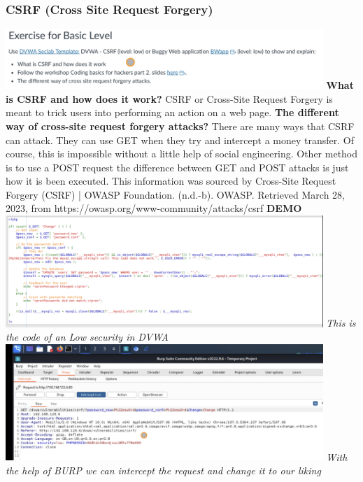 \documentclass[12pt, letterpaper]{article}
\begin{document}
\subsubsection{CSRF (Cross Site Request Forgery)}
\includegraphics[width=0.9\textwidth]{fotos/Week 4/CSRF basic.jpeg}
\textbf{What is CSRF and how does it work?}
\hfill\break
\hfill\break
CSRF or Cross-Site Request Forgery is meant to trick users into performing an action on a web page.
\hfill\break
\hfill\break
\textbf{The different way of cross-site request forgery attacks?}
\hfill\break
There are many ways that CSRF can attack. They can use GET when they try and intercept a money transfer. Of course, this is impossible without a little help of social engineering. Other method is to use a POST request the difference between GET and POST attacks is just how it is been executed.
\hfill\break
\hfill\break
This information was sourced by Cross-Site Request Forgery (CSRF) | OWASP Foundation. (n.d.-b). OWASP. Retrieved March 28, 2023, from https://owasp.org/www-community/attacks/csrf
\hfill\break
\hfill\break
\textbf{DEMO}
\hfill\break
\hfill\break
\includegraphics[width=0.9\textwidth]{fotos/Week 4/CSRF/CSRF source code low.jpeg}
\break
\emph{This is the code of an Low security in DVWA}
\hfill\break
\hfill\break
\includegraphics[width=0.9\textwidth]{fotos/Week 4/CSRF/Original get requesst.jpeg}
\break
\emph{With the help of BURP we can intercept the request and change it to our liking}
\end{document}
